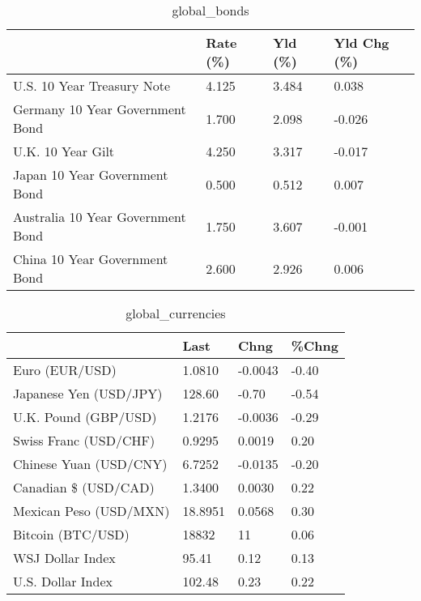 \documentclass{article}%
\begin{document}
%


\begin{table}[htbp]%
\caption{global\_bonds}%
\centering%
\begin{adjustbox}{width=1\textwidth}%
\begin{tabular}{llll}
\toprule
                                  & Rate (\%) & Yld (\%) & Yld Chg (\%) \\
\midrule
       U.S. 10 Year Treasury Note &    4.125 &   3.484 &       0.038 \\
  Germany 10 Year Government Bond &    1.700 &   2.098 &      -0.026 \\
                U.K. 10 Year Gilt &    4.250 &   3.317 &      -0.017 \\
    Japan 10 Year Government Bond &    0.500 &   0.512 &       0.007 \\
Australia 10 Year Government Bond &    1.750 &   3.607 &      -0.001 \\
    China 10 Year Government Bond &    2.600 &   2.926 &       0.006 \\
\bottomrule
\end{tabular}
%
\end{adjustbox}%
\end{table}

%


\begin{table}[htbp]%
\caption{global\_currencies}%
\centering%
\begin{adjustbox}{width=1\textwidth}%
\begin{tabular}{llll}
\toprule
                       &    Last &    Chng & \%Chng \\
\midrule
        Euro (EUR/USD) &  1.0810 & -0.0043 & -0.40 \\
Japanese Yen (USD/JPY) &  128.60 &   -0.70 & -0.54 \\
  U.K. Pound (GBP/USD) &  1.2176 & -0.0036 & -0.29 \\
 Swiss Franc (USD/CHF) &  0.9295 &  0.0019 &  0.20 \\
Chinese Yuan (USD/CNY) &  6.7252 & -0.0135 & -0.20 \\
  Canadian \$ (USD/CAD) &  1.3400 &  0.0030 &  0.22 \\
Mexican Peso (USD/MXN) & 18.8951 &  0.0568 &  0.30 \\
     Bitcoin (BTC/USD) &   18832 &      11 &  0.06 \\
      WSJ Dollar Index &   95.41 &    0.12 &  0.13 \\
     U.S. Dollar Index &  102.48 &    0.23 &  0.22 \\
\bottomrule
\end{tabular}
%
\end{adjustbox}%
\end{table}
\end{document}
